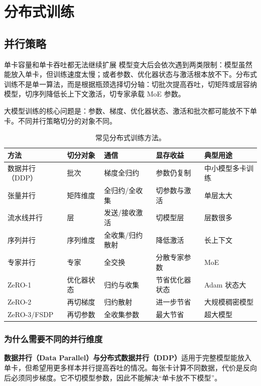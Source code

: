\part{分布式训练}

\chapter{并行策略}
\label{sec:distributed}

\begin{motivationbox}{单卡容量和单卡吞吐都无法继续扩展}
模型变大后会依次遇到两类限制：模型虽然能放入单卡，但训练速度太慢；或者参数、优化器状态与激活根本放不下。分布式训练不是单一算法，而是根据瓶颈选择切分轴：切批次提高吞吐，切矩阵或层容纳模型，切序列降低长上下文激活，切专家承载 MoE 参数。
\end{motivationbox}

大模型训练的核心问题是：参数、梯度、优化器状态、激活和批次都可能放不下单卡。不同并行策略切分的对象不同。

\begin{table}[htbp]
\centering
\small
\begin{tabularx}{0.98\textwidth}{lYYYY}
\toprule
方法 & 切分对象 & 通信 & 显存收益 & 典型用途\\
\midrule
数据并行（DDP） & 批次 & 梯度全归约 & 参数仍复制 & 中小模型多卡训练\\
张量并行 & 矩阵维度 & 全归约/全收集 & 切参数与激活 & 单层太大\\
流水线并行 & 层 & 发送/接收激活 & 切模型层 & 层数很多\\
序列并行 & 序列维度 & 全收集/归约散射 & 降低激活 & 长上下文\\
专家并行 & 专家 & 全交换 & 分散专家参数 & MoE\\
ZeRO-1 & 优化器状态 & 归约与收集 & 节省优化器状态 & Adam 状态大\\
ZeRO-2 & 再切梯度 & 归约散射 & 进一步节省 & 大规模稠密模型\\
ZeRO-3/FSDP & 再切参数 & 全收集参数 & 最大节省 & 超大模型\\
\bottomrule
\end{tabularx}
\caption{常见分布式训练方法。}
\end{table}

\section{为什么需要不同的并行维度}

\textbf{数据并行（Data Parallel）与分布式数据并行（DDP）}适用于完整模型能放入单卡，但希望用更多样本并行提高吞吐的情况。每张卡计算不同数据，代价是反向后必须同步梯度。它不切模型参数，因此不能解决“单卡放不下模型”。

